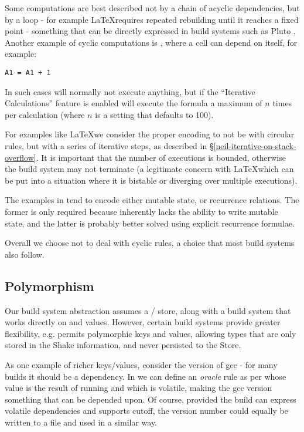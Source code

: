 Some computations are best described not by a chain of acyclic dependencies, but by a loop - for example \LaTeX requires repeated rebuilding until it reaches a fixed point - something that can be directly expressed in build systems such as Pluto \cite{pluto}. Another example of cyclic computations is \Excel, where a cell can depend on itself, for example:

\begin{verbatim}
A1 = A1 + 1
\end{verbatim}

In such cases \Excel will normally not execute anything, but if the ``Iterative Calculations'' feature is enabled will execute the formula a maximum of $n$ times per calculation (where $n$ is a setting that defaults to 100).

For examples like \LaTeX we consider the proper encoding to not be with circular rules, but with a series of iterative steps, as described in \S\ref{neil-iterative-on-stack-overflow}. It is important that the number of executions is bounded, otherwise the build system may not terminate (a legitimate concern with \LaTeX which can be put into a situation where it is bistable or diverging over multiple executions).

The examples in \Excel tend to encode either mutable state, or recurrence relations. The former is only required because \Excel inherently lacks the ability to write mutable state, and the latter is probably better solved using explicit recurrence formulae.

Overall we choose not to deal with cyclic rules, a choice that most build systems also follow.

\subsection{Polymorphism}\label{sec-polymorphism}

Our build system abstraction assumes a / store, along with a build system that works directly on  and  values. However, certain build systems provide greater flexibility, e.g. \Shake permits polymorphic keys and values, allowing types that are only stored in the Shake information, and never persisted to the Store.

As one example of richer keys/values, consider the version of \textsf{gcc} - for many builds it should be a dependency. In \Shake we can define an \textit{oracle} rule as per \cite{mitchell2012shake} whose value is the result of running  and which is volatile, making the \textsf{gcc} version something that can be depended upon. Of course, provided the build can express volatile dependencies and supports cutoff, the version number could equally be written to a file and used in a similar way.

